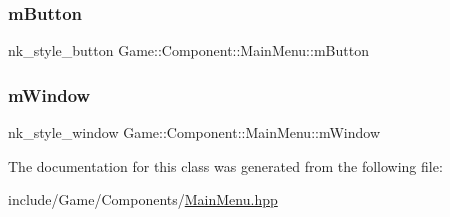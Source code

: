 \subsubsection{\texorpdfstring{m\+Button}{mButton}}
{\footnotesize\ttfamily nk\+\_\+style\+\_\+button Game\+::\+Component\+::\+Main\+Menu\+::m\+Button}

\mbox{\label{class_game_1_1_component_1_1_main_menu_a2c8b00fefeff1145c56bda79bdbe556f}} 
\subsubsection{\texorpdfstring{m\+Window}{mWindow}}
{\footnotesize\ttfamily nk\+\_\+style\+\_\+window Game\+::\+Component\+::\+Main\+Menu\+::m\+Window}



The documentation for this class was generated from the following file\+:\begin{DoxyCompactItemize}
\item 
include/\+Game/\+Components/\mbox{\hyperlink{_main_menu_8hpp}{Main\+Menu.\+hpp}}\end{DoxyCompactItemize}
